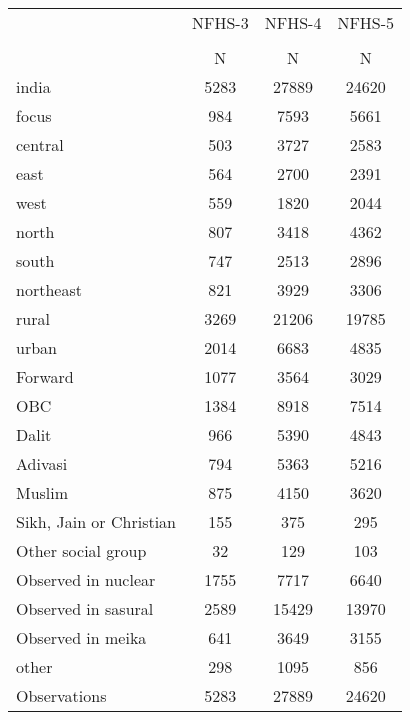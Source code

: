 {
\def\sym#1{\ifmmode^{#1}\else\(^{#1}\)\fi}
\begin{tabular}{l*{3}{c}}
\toprule
                    &      NFHS-3&      NFHS-4&      NFHS-5\\
                    &\multicolumn{1}{c}{}&\multicolumn{1}{c}{}&\multicolumn{1}{c}{}\\
                    &           N&           N&           N\\
\midrule
india               &        5283&       27889&       24620\\
focus               &         984&        7593&        5661\\
central             &         503&        3727&        2583\\
east                &         564&        2700&        2391\\
west                &         559&        1820&        2044\\
north               &         807&        3418&        4362\\
south               &         747&        2513&        2896\\
northeast           &         821&        3929&        3306\\
rural               &        3269&       21206&       19785\\
urban               &        2014&        6683&        4835\\
Forward             &        1077&        3564&        3029\\
OBC                 &        1384&        8918&        7514\\
Dalit               &         966&        5390&        4843\\
Adivasi             &         794&        5363&        5216\\
Muslim              &         875&        4150&        3620\\
Sikh, Jain or Christian&         155&         375&         295\\
Other social group  &          32&         129&         103\\
Observed in nuclear &        1755&        7717&        6640\\
Observed in sasural &        2589&       15429&       13970\\
Observed in meika   &         641&        3649&        3155\\
other               &         298&        1095&         856\\
\midrule
Observations        &        5283&       27889&       24620\\
\bottomrule
\end{tabular}
}
